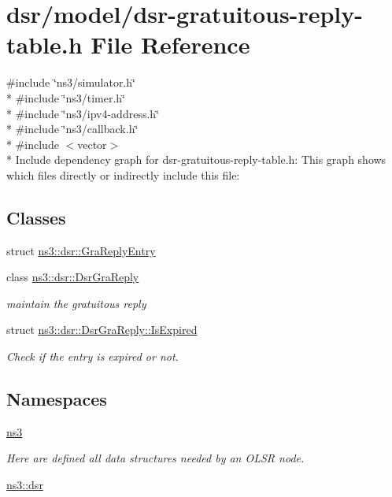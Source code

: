 \hypertarget{dsr-gratuitous-reply-table_8h}{}\section{dsr/model/dsr-\/gratuitous-\/reply-\/table.h File Reference}
\label{dsr-gratuitous-reply-table_8h}
{\ttfamily \#include \char`\"{}ns3/simulator.\+h\char`\"{}}\\*
{\ttfamily \#include \char`\"{}ns3/timer.\+h\char`\"{}}\\*
{\ttfamily \#include \char`\"{}ns3/ipv4-\/address.\+h\char`\"{}}\\*
{\ttfamily \#include \char`\"{}ns3/callback.\+h\char`\"{}}\\*
{\ttfamily \#include $<$vector$>$}\\*
Include dependency graph for dsr-\/gratuitous-\/reply-\/table.h\+:
This graph shows which files directly or indirectly include this file\+:
\subsection*{Classes}
\begin{DoxyCompactItemize}
\item 
struct \hyperlink{structns3_1_1dsr_1_1GraReplyEntry}{ns3\+::dsr\+::\+Gra\+Reply\+Entry}
\item 
class \hyperlink{classns3_1_1dsr_1_1DsrGraReply}{ns3\+::dsr\+::\+Dsr\+Gra\+Reply}
\begin{DoxyCompactList}\small\item\em maintain the gratuitous reply \end{DoxyCompactList}\item 
struct \hyperlink{structns3_1_1dsr_1_1DsrGraReply_1_1IsExpired}{ns3\+::dsr\+::\+Dsr\+Gra\+Reply\+::\+Is\+Expired}
\begin{DoxyCompactList}\small\item\em Check if the entry is expired or not. \end{DoxyCompactList}\end{DoxyCompactItemize}
\subsection*{Namespaces}
\begin{DoxyCompactItemize}
\item 
 \hyperlink{namespacens3}{ns3}
\begin{DoxyCompactList}\small\item\em Here are defined all data structures needed by an O\+L\+SR node. \end{DoxyCompactList}\item 
 \hyperlink{namespacens3_1_1dsr}{ns3\+::dsr}
\end{DoxyCompactItemize}
